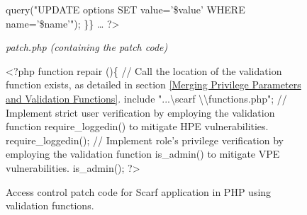 \documentclass[10pt,journal,compsoc]{IEEEtran}
\begin{document}
\begin{CJK}{UTF8}{gbsn}
\begin{figure*}[ht]
\begin{minipage}[t]{0.48\textwidth}
\begin{algorithm}[H]
\begin{algorithmic}[1]
        \State query("UPDATE options SET value='\$value' WHERE name='\$name'");
    \EndFor
\EndIf
\State \}\}
\State …
\State ?\textgreater 
\end{algorithmic}
\end{algorithm}
\end{minipage}
\hfill
\begin{minipage}[t]{1\textwidth}
\begin{algorithm}[H]
\small
\renewcommand{\thealgorithm}{}
\caption{\textit{patch.php (containing the patch code)}}
\begin{algorithmic}[1]
\State \textless?php
\State function repair ()\{
\Statex \textcolor[rgb]{0.16,0.32,0.66}{// Call the location of the validation function exists, as detailed in section \ref{Merging Privilege Parameters and Validation Functions}.}
\State include "...\textbackslash scarf \textbackslash \textbackslash functions.php";
\Statex \textcolor[rgb]{0.16,0.32,0.66}{// Implement strict user verification by employing the validation function require\_loggedin() to mitigate HPE vulnerabilities.}
\State require\_loggedin();
\Statex \textcolor[rgb]{0.16,0.32,0.66}{// Implement role's privilege verification by employing the validation function is\_admin() to mitigate VPE vulnerabilities.}
\State is\_admin();
\State?\textgreater 
\end{algorithmic}
\end{algorithm}
\end{minipage}
\caption{Access control patch code for Scarf application in PHP using validation functions.}
\label{scarf}
\end{figure*}


\end{CJK}
\end{document}
